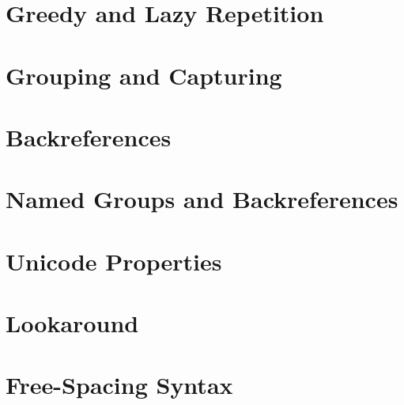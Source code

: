 \chapter{Greedy and Lazy Repetition}













\chapter{Grouping and Capturing}













\chapter{Backreferences}






\chapter{Named Groups and Backreferences}






\chapter{Unicode Properties}









\chapter{Lookaround}










\chapter{Free-Spacing Syntax}















\clearpage